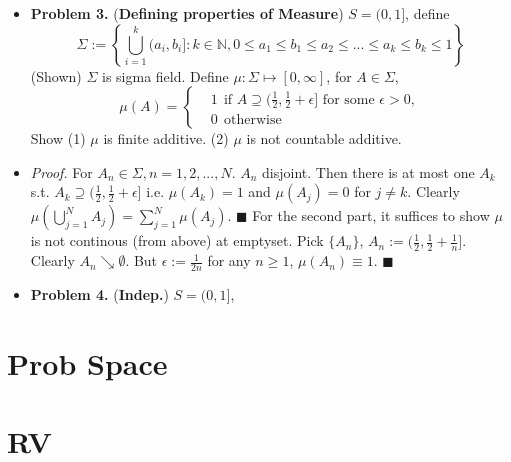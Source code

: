 \documentclass[a4paper,12pt,twoside]{book}
\begin{document}
\begin{itemize}
	\item[]\textbf{Problem 3.} (\textbf{Defining properties of Measure}) $S=(0,1]$, define
	\begin{equation}
		\Sigma := \left\{\bigcup_{i=1}^{k}(a_i, b_i]: k\in \mathbb{N}, 0\leq a_1 \leq b_1 \leq a_2 \leq ... \leq a_k \leq b_k \leq 1\right\} 
	\end{equation}
	(Shown) $\Sigma$ is sigma field. Define $\mu: \Sigma \mapsto [0, \infty]$, for $A\in \Sigma$,
	\begin{equation}
		\mu(A)=
		\begin{cases}
		&1~~\text{if $A\supseteq (\frac{1}{2}, \frac{1}{2}+\epsilon]$ for some $\epsilon>0$},\\
		&0~~\text{otherwise}
	\end{cases}
	\end{equation}
	Show (1) $\mu$ is finite additive. (2) $\mu$ is not countable additive.

	\item[]\textit{Proof.} For $A_n\in \Sigma, n=1,2,...,N$. $A_n$ disjoint. \newline
	Then there is at most one $A_k$ s.t. $A_k \supseteq (\frac{1}{2}, \frac{1}{2}+\epsilon]$ i.e. $\mu(A_k)=1$ and $\mu(A_j)=0$ for $j\ne k$. Clearly $\mu(\bigcup_{j=1}^{N}A_j)=\sum_{j=1}^N \mu(A_j)$. $\blacksquare$ \newline
	For the second part, it suffices to show $\mu$ is not continous (from above) at emptyset.\newline
	Pick $\{A_n\}$, $A_n:=(\frac{1}{2}, \frac{1}{2}+\frac{1}{n}]$. Clearly $A_n \searrow \emptyset$. But $\epsilon:=\frac{1}{2n}$ for any $n\geq 1$, $\mu(A_n)\equiv1$. $\blacksquare$
\end{itemize}


\begin{itemize}
	\item[]\textbf{Problem 4.} (\textbf{Indep.}) $S=(0,1]$,
\end{itemize}

\section{Prob Space}

\section{RV}
\end{document}

